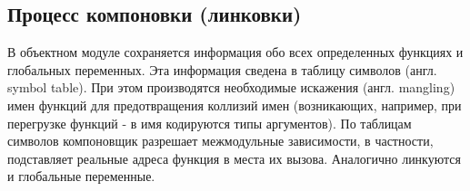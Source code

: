 \subsection{Процесс компоновки (линковки)}

В объектном модуле сохраняется информация обо всех определенных функциях
и глобальных переменных. Эта информация сведена в таблицу символов
(англ. symbol table). При этом производятся необходимые искажения (англ.
mangling) имен функций для предотвращения коллизий имен (возникающих,
например, при перегрузке функций - в имя кодируются типы аргументов). По
таблицам символов компоновщик разрешает межмодульные зависимости, в
частности, подставляет реальные адреса функция в места их вызова.
Аналогично линкуются и глобальные переменные.
